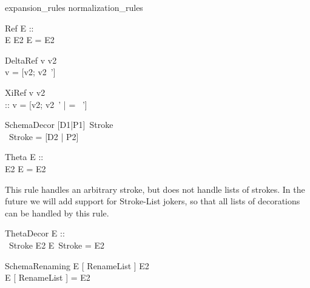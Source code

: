 \begin{zsection}
  \SECTION expansion\_rules \parents normalization\_rules
\end{zsection}

\begin{zedrule}{Ref}
  E :: \power [D | true] \\
  E \hasDefn E2
\derives
  E = E2
\end{zedrule}

\begin{zedrule}{DeltaRef}
  \Delta \unprefix v \is v2 \\
\derives
  v = [v2; v2~']
\end{zedrule}

\begin{zedrule}{XiRef}
  \Xi \unprefix v \is v2 \\
  [v2|true] :: \power [D2 | true] 
\derives
  v = [v2; v2~' | \theta [D2|true] = \theta [D2|true]~']
\end{zedrule}

\begin{zedrule}{SchemaDecor}
   [D1|P1]~Stroke \is [D2|P2] \\
\derives
   [D1|P1]~Stroke = [D2 | P2]
\end{zedrule}

\begin{zedrule}{Theta}
  E :: \power [D | true] \\
  \theta [D | true] \is E2
\derives
  \theta E = E2
\end{zedrule}

This rule handles an arbitrary stroke, but does not handle
lists of strokes.  In the future we will add
support for Stroke-List jokers, so that all lists of
decorations can be handled by this rule.

\begin{zedrule}{ThetaDecor}
  E :: \power [D | true] \\
  \theta [D | true]~Stroke \is E2
\derives
  \theta E~Stroke = E2
\end{zedrule}

\begin{zedrule}{SchemaRenaming}
   E [ RenameList ] \is E2 \\
\derives
   E [ RenameList ] = E2
\end{zedrule}

